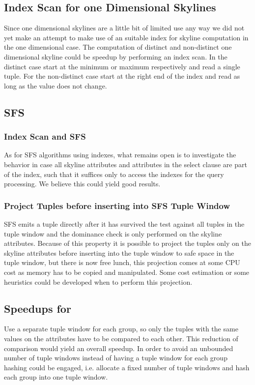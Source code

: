 \subsection{Index Scan for one Dimensional Skylines}
\label{sec:index-scan-for-1dim}
Since one dimensional skylines are a little bit of limited use any way
we did not yet make an attempt to make use of an suitable index for
skyline computation in the one dimensional case. The computation of
distinct and non-distinct one dimensional skyline could be speedup by
performing an index scan. In the distinct case start at the minimum or
maximum respectively and read a single tuple. For the non-distinct case
start at the right end of the index and read as long as the value does
not change.


\subsection{SFS}
\subsubsection{Index Scan and SFS}
As for SFS algorithms using indexes, what remains open is to
investigate the behavior in case all skyline attributes and attributes
in the select clause are part of the index, such that it suffices only
to access the indexes for the query processing.  We believe this could
yield good results.


\subsubsection{Project Tuples before inserting into SFS Tuple Window}
SFS emits a tuple directly after it has survived the test against all
tuples in the tuple window and the dominance check is only performed
on the skyline attributes.  Because of this property it is possible to
project the tuples only on the skyline attributes before inserting
into the tuple window to safe space in the tuple window, but there is
now free lunch, this projection comes at some CPU cost as memory has
to be copied and manipulated.  Some cost estimation or some heuristics
could be developed when to perform this projection.


\subsection{Speedups for }
\label{sec:speedup-skyline-diff}
%
Use a separate tuple window for each 
group, so only the tuples with the same values on the
 attributes have to be compared to each
other. This reduction of comparison would yield an overall speedup.
In order to avoid an unbounded number of tuple windows instead of
having a tuple window for each  group
hashing could be engaged, i.e. allocate a fixed number of tuple
windows and hash each  group into one tuple
window.

